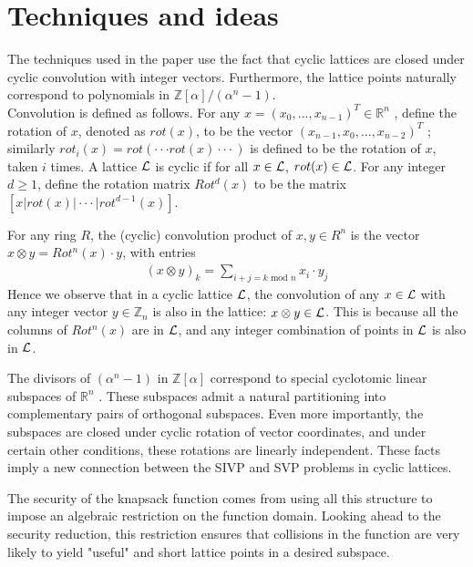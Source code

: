 \section{Techniques and ideas}
The techniques used in the paper use the fact that cyclic lattices are closed under cyclic convolution with integer vectors. Furthermore, the lattice points naturally correspond to polynomials in $\mathbb{Z}[\alpha]/(\alpha^n - 1)$.
\\
Convolution is defined as follows. For any $x = (x_0 , . . . , x_{n-1})^T \in \mathbb{R}^n$ , define the rotation of $x$,
denoted as $rot(x)$, to be the vector $(x_{n-1} , x_0 , . . . , x_{n−2})^T$ ; similarly $rot_i(x) = rot(· · · rot(x) · · · )$ is
defined to be the rotation of $x$, taken $i$ times. A lattice $\mathcal{L}$ is cyclic if for all $x \in \mathcal{L}$, $rot(x) \in \mathcal{L}$. For any integer $d \geq 1$, define the rotation matrix $Rot^d (x)$ to be the matrix $[x|rot(x)| · · · |rot^{d-1}(x)]$.
\par
For any ring $R$, the (cyclic) convolution product of $x, y \in R^n$ is the vector $x \otimes y = Rot^n(x) \cdot y$,
with entries 
\begin{align*}
 (x \otimes y)_k = \sum_{i+j = k \text{ mod }n} x_i \cdot y_j
\end{align*}
Hence we observe that in a cyclic lattice $\mathcal{L}$, the convolution of any $x \in \mathcal{L}$ with any integer vector $y \in \mathbb{Z}_n$ is also in the lattice: $x \otimes y \in \mathcal{L}$. This is because all the columns of $Rot^n(x)$ are in $\mathcal{L}$, and any integer combination of points in $\mathcal{L}$ is also in $\mathcal{L}$.
\par
The divisors of $(\alpha^n - 1)$ in $\mathbb{Z}[\alpha]$ correspond to special cyclotomic linear subspaces of $\mathbb{R}^n$ . These
subspaces admit a natural partitioning into complementary pairs of orthogonal subspaces. Even more importantly, the subspaces are closed under cyclic rotation of vector coordinates, and under certain other conditions, these rotations are linearly independent. These facts imply a new connection between the SIVP and SVP problems in cyclic lattices.
\par
The security of the knapsack function comes from using all this structure to impose an algebraic
restriction on the function domain. Looking ahead to the security reduction, this restriction ensures
that collisions in the function are very likely to yield "useful" and short lattice points in a desired
subspace.